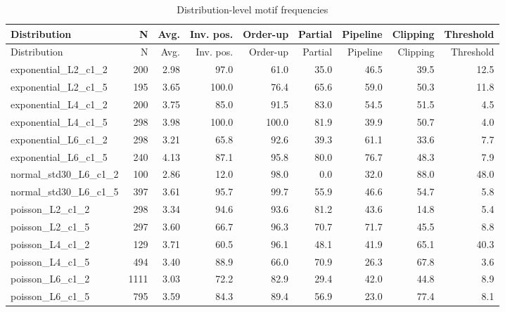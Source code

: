 \documentclass[11pt]{article}
\begin{document}
\begingroup
\small
\setlength{\tabcolsep}{3pt}
\begin{longtable}{lrrrrrrrr}
\caption{Distribution-level motif frequencies}\\
\toprule
Distribution & N & Avg. & Inv. pos. & Order-up & Partial & Pipeline & Clipping & Threshold \\
\midrule
\endfirsthead
\toprule
Distribution & N & Avg. & Inv. pos. & Order-up & Partial & Pipeline & Clipping & Threshold \\
\midrule
\endhead
exponential\_L2\_c1\_2 & 200 & 2.98 & 97.0 & 61.0 & 35.0 & 46.5 & 39.5 & 12.5 \\
exponential\_L2\_c1\_5 & 195 & 3.65 & 100.0 & 76.4 & 65.6 & 59.0 & 50.3 & 11.8 \\
exponential\_L4\_c1\_2 & 200 & 3.75 & 85.0 & 91.5 & 83.0 & 54.5 & 51.5 & 4.5 \\
exponential\_L4\_c1\_5 & 298 & 3.98 & 100.0 & 100.0 & 81.9 & 39.9 & 50.7 & 4.0 \\
exponential\_L6\_c1\_2 & 298 & 3.21 & 65.8 & 92.6 & 39.3 & 61.1 & 33.6 & 7.7 \\
exponential\_L6\_c1\_5 & 240 & 4.13 & 87.1 & 95.8 & 80.0 & 76.7 & 48.3 & 7.9 \\
normal\_std30\_L6\_c1\_2 & 100 & 2.86 & 12.0 & 98.0 & 0.0 & 32.0 & 88.0 & 48.0 \\
normal\_std30\_L6\_c1\_5 & 397 & 3.61 & 95.7 & 99.7 & 55.9 & 46.6 & 54.7 & 5.8 \\
poisson\_L2\_c1\_2 & 298 & 3.34 & 94.6 & 93.6 & 81.2 & 43.6 & 14.8 & 5.4 \\
poisson\_L2\_c1\_5 & 297 & 3.60 & 66.7 & 96.3 & 70.7 & 71.7 & 45.5 & 8.8 \\
poisson\_L4\_c1\_2 & 129 & 3.71 & 60.5 & 96.1 & 48.1 & 41.9 & 65.1 & 40.3 \\
poisson\_L4\_c1\_5 & 494 & 3.40 & 88.9 & 66.0 & 70.9 & 26.3 & 67.8 & 3.6 \\
poisson\_L6\_c1\_2 & 1111 & 3.03 & 72.2 & 82.9 & 29.4 & 42.0 & 44.8 & 8.9 \\
poisson\_L6\_c1\_5 & 795 & 3.59 & 84.3 & 89.4 & 56.9 & 23.0 & 77.4 & 8.1 \\
\bottomrule
\end{longtable}
\endgroup
\end{document}
